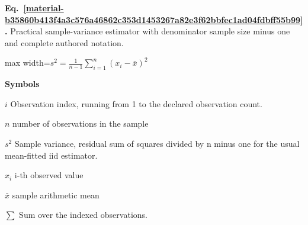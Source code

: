 \documentclass[11pt,a4paper]{article}
\begin{document}
\par\medskip
\begin{samepage}
\label{material-b35860b413f4a3c576a46862c353d1453267a82e3f62bbfec1ad04fdbff55b99}
\noindent\textbf{Eq.~\ref*{material-b35860b413f4a3c576a46862c353d1453267a82e3f62bbfec1ad04fdbff55b99}.} Practical sample-variance estimator with denominator sample size minus one and complete authored notation.\par\nopagebreak
\begin{center}\begin{adjustbox}{max width=\linewidth}$\displaystyle s^2=\frac1{n-1}\sum_{i=1}^n(x_i-\bar x)^2$\end{adjustbox}\end{center}

\par\noindent\textbf{Symbols}

\par\noindent\textbf{\(i\)} Observation index, running from 1 to the declared observation count.

\par\noindent\textbf{\(n\)} number of observations in the sample

\par\noindent\textbf{\(s^2\)} Sample variance, residual sum of squares divided by n minus one for the usual mean-fitted iid estimator.

\par\noindent\textbf{\(x_i\)} i-th observed value

\par\noindent\textbf{\(\bar{x}\)} sample arithmetic mean

\par\noindent\textbf{\(\sum\)} Sum over the indexed observations.

\end{samepage}
\medskip
\end{document}
